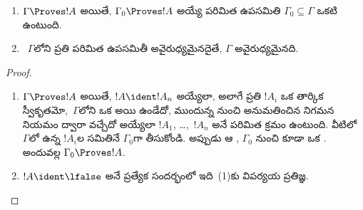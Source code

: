 \documentclass[../../../include/open-logic-section]{subfiles}
\begin{document}
\begin{prop}[సంహతత్వం]
  \begin{enumerate}
  \item $\Gamma \Proves !A$ అయితే, $\Gamma_0 \Proves !A$ అయ్యే
    పరిమిత ఉపసమితి $\Gamma_0 \subseteq \Gamma$ ఒకటి ఉంటుంది.
  \item~$\Gamma$లోని ప్రతి పరిమిత ఉపసమితీ అవైరుధ్యమైనదైతే,
    $\Gamma$ అవైరుధ్యమైనది.
  \end{enumerate}
\end{prop}

\begin{proof}
  \begin{enumerate}
    \item $\Gamma \Proves !A$ అయితే, $!A \ident !A_n$ అయ్యేలా,
      అలాగే ప్రతి $!A_i$ ఒక తార్కిక స్వీకృతమో,~$\Gamma$లోని ఒక
       అయి ఉండేదో, ముందున్న  నుంచి అనుమతించిన నిగమన నియమం
      ద్వారా వచ్చేదో అయ్యేలా $!A_1$, \dots,~$!A_n$ అనే పరిమిత
       క్రమం ఉంటుంది. వీటిలో~$\Gamma$లో ఉన్న $!A_i$ల
      సమితినే $\Gamma_0$గా తీసుకోండి. అప్పుడు ఆ ,
      $\Gamma_0$ నుంచి కూడా ఒక . అందువల్ల
      $\Gamma_0 \Proves !A$.
    \item $!A \ident \lfalse$ అనే ప్రత్యేక సందర్భంలో ఇది~(1)కు
      విపర్యయ ప్రతిజ్ఞ.
\end{enumerate}
\end{proof}
\end{document}
